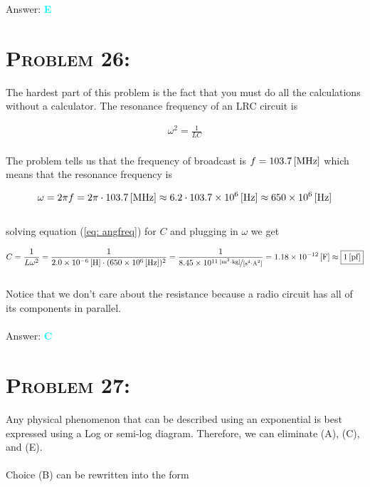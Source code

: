 \documentclass{article}
\providecommand{\e}[1]{\ensuremath{\times 10^{#1}}}
\begin{document}
Answer: \textbf{\textcolor{cyan}E}\\


\section{\textsc{Problem 26:}} The hardest part of this problem is the fact that you must do all the calculations without a calculator. The resonance frequency of an LRC circuit is

\begin{gather}
\label{eq: angfreq}\omega^{2} = \frac{1}{LC}
\end{gather}
\\
The problem tells us that the frequency of broadcast is $f = \unit[103.7]{[MHz]}$ which means that the resonance frequency is 

\begin{gather}
\omega = 2 \pi f = 2 \pi \cdot \unit[103.7]{[MHz]} \approx 6.2 \cdot \unit[103.7\e{6}]{[Hz]} \approx \unit[650\e{6}]{[Hz]}\nonumber
\end{gather}
\\
solving equation (\ref{eq: angfreq}) for $C$ and plugging in $\omega$ we get

\begin{gather}
C =  \frac{1}{L \omega^{2}} = \frac{1}{\unit[2.0\e{-6}]{[H]} \cdot (\unit[650\e{6}]{[Hz]})^{2}} = \frac{1}{\unitfrac[8.45\e{11}]{[m^{2} \cdot kg]}{[s^{4} \cdot A^{2}]}} = \unit[1.18\e{-12}]{[F]} \approx \boxed{\unit[1]{[pf]}}\nonumber
\end{gather}
\\
Notice that we don't care about the resistance because a radio circuit has all of its components in parallel.
\\\\
Answer: \textbf{\textcolor{cyan}C}\\


\section{\textsc{Problem 27:}} Any physical phenomenon that can be described using an exponential is best expressed using a Log or semi-log diagram. Therefore, we can eliminate (A), (C), and (E). \\
\\
Choice (B) can be rewritten into the form 
\end{document}
